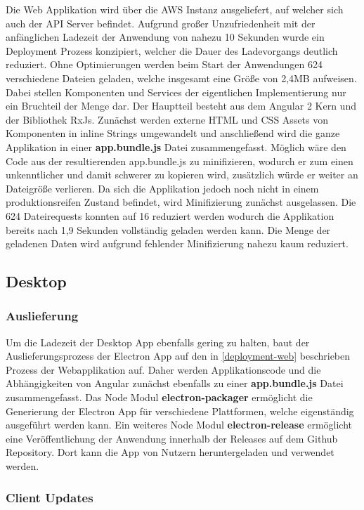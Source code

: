 Die Web Applikation wird über die \ac{AWS} Instanz ausgeliefert, auf welcher sich auch der \ac{API} Server befindet.
Aufgrund großer Unzufriedenheit mit der anfänglichen Ladezeit der Anwendung von nahezu 10 Sekunden wurde ein Deployment
Prozess konzipiert, welcher die Dauer des Ladevorgangs deutlich reduziert.
Ohne Optimierungen werden beim Start der Anwendungen 624 verschiedene Dateien geladen,
welche insgesamt eine Größe von 2,4MB aufweisen.
Dabei stellen Komponenten und Services der eigentlichen Implementierung nur ein Bruchteil der Menge dar.
Der Hauptteil besteht aus dem Angular 2 Kern und der Bibliothek RxJs.
Zunächst werden externe \ac{HTML} und \ac{CSS} Assets von Komponenten in
inline Strings umgewandelt und anschließend wird die ganze Applikation in einer \textbf{app.bundle.js} Datei zusammengefasst.
Möglich wäre den Code aus der resultierenden app.bundle.js zu minifizieren,
wodurch er zum einen unkenntlicher und damit schwerer zu kopieren wird,
zusätzlich würde er weiter an Dateigröße verlieren. Da sich die Applikation \projectname{}
jedoch noch nicht in einem produktionsreifen Zustand befindet, wird Minifizierung zunächst ausgelassen.
Die 624 Dateirequests konnten auf 16 reduziert werden wodurch die Applikation bereits nach 1,9
Sekunden vollständig geladen werden kann.
Die Menge der geladenen Daten wird aufgrund fehlender Minifizierung nahezu kaum reduziert.

\subsection{Desktop}

\subsubsection{Auslieferung}
Um die Ladezeit der Desktop App ebenfalls gering zu halten, baut der Auslieferungsprozess der Electron App
auf den in \ref{deployment-web} beschrieben Prozess der Webapplikation auf. Daher werden Applikationscode und die
Abhängigkeiten von Angular zunächst ebenfalls zu einer \textbf{app.bundle.js} Datei zusammengefasst.
Das Node Modul \textbf{electron-packager} ermöglicht die Generierung der Electron App für verschiedene Plattformen,
welche eigenständig ausgeführt werden kann.
Ein weiteres Node Modul \textbf{electron-release} ermöglicht eine Veröffentlichung
der Anwendung innerhalb der Releases auf dem Github Repository.
Dort kann die App von Nutzern heruntergeladen und verwendet werden.

\subsubsection{Client Updates}

